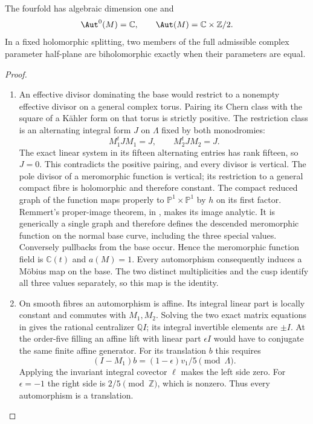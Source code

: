 \begin{theorem}\label{night:P1A.4}
The fourfold has algebraic dimension one and
\[
\Aut^0(M)=\mathbb C,\qquad
\Aut(M)=\mathbb C\times\mathbb Z/2.
\]
In a fixed holomorphic splitting, two members of the full
admissible complex parameter half-plane are biholomorphic
exactly when their parameters are equal.
\end{theorem}
\begin{proof}
\begin{enumerate}[label=\arabic*.]
\item An effective divisor dominating the base would restrict to
a nonempty effective divisor on a general complex torus.
Pairing its Chern class with the square of a Kähler form
on that torus is strictly positive. The restriction class is an alternating integral form $J$ on $\Lambda$
fixed by both monodromies:
\[
M_1^tJM_1=J,\qquad M_2^tJM_2=J.
\]
The exact linear system in its fifteen alternating entries has rank
fifteen, so $J=0$.  This contradicts the positive pairing, and every
divisor is vertical.
The pole divisor of a meromorphic function is vertical;
its restriction to a general compact fibre is holomorphic
and therefore constant. The compact reduced graph of the function maps properly to
$\mathbb P^1\times\mathbb P^1$ by $h$ on its first factor.
Remmert's proper-image theorem, in
\cite[\S7, Satz~1, p.~60]{Grauert1960D}, makes its image analytic.
It is generically a single graph and therefore defines the descended
meromorphic function on the normal base curve, including the three
special values.
Conversely pullbacks from the base occur. Hence the
meromorphic function field is $\mathbb C(t)$ and $a(M)=1$.
Every automorphism consequently induces a Möbius map on
the base. The two distinct multiplicities and the cusp
identify all three values separately, so this map is the
identity.

\item On smooth fibres an automorphism is affine. Its integral
linear part is locally constant and commutes with $M_1,M_2$.
Solving the two exact matrix equations in
 gives the rational
centralizer $\mathbb Q I$; its integral invertible elements
are $\pm I$. At the order-five filling an affine lift with
linear part $\epsilon I$ would have to conjugate the same
finite affine generator. For its translation $b$ this
requires
\[
(I-M_1)b=(1-\epsilon)v_1/5\pmod\Lambda.
\]
Applying the invariant integral covector $\ell$ makes the
left side zero. For $\epsilon=-1$ the right side is
$2/5\pmod\mathbb Z$, which is nonzero. Thus every
automorphism is a translation.


\end{enumerate}
\end{proof}
